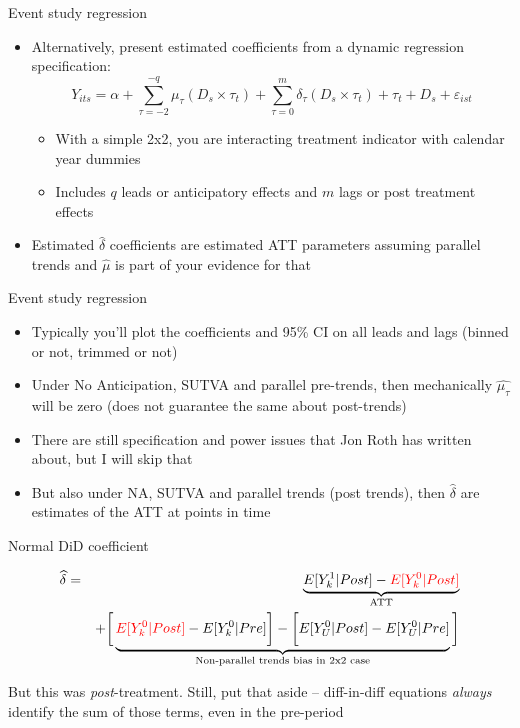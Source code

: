 \documentclass{beamer}
\begin{document}
\begin{frame}{Event study regression}
	
	\begin{itemize}
	\item Alternatively, present estimated coefficients from a dynamic regression specification:
 $$Y_{its} = \alpha + \sum_{\tau=-2}^{-q}\mu_{\tau} (D_s \times \tau_t) + \sum_{\tau=0}^m\delta_{\tau} (D_s \times \tau_t) + \tau_t + D_s + \varepsilon_{ist}$$
		\begin{itemize}
		\item With a simple 2x2, you are interacting treatment indicator with calendar year dummies
		\item Includes $q$ leads or anticipatory effects and $m$ lags or post treatment effects
		\end{itemize}
	\item Estimated $\widehat{\delta}$ coefficients are estimated ATT parameters assuming parallel trends and $\widehat{\mu}$ is part of your evidence for that
	\end{itemize}
\end{frame}

\begin{frame}{Event study regression}


\begin{itemize}
\item  Typically you'll plot the coefficients and 95\% CI on all leads and lags (binned or not, trimmed or not) 
\item Under No Anticipation, SUTVA and parallel pre-trends, then mechanically $\widehat{\mu_{\tau}}$ will be zero (does not guarantee the same about post-trends)
\item There are still specification and power issues that Jon Roth has written about, but I will skip that
\item But also under NA, SUTVA and parallel trends (post trends), then $\widehat{\delta}$ are estimates of the ATT at points in time
\end{itemize}

\end{frame}

\begin{frame}{Normal DiD coefficient}

\begin{eqnarray*}
\widehat{\delta} &=& \underbrace{E[Y^1_k | Post] - \textcolor{red}{E[Y^0_k | Post]}}_{\mathclap{\text{ATT}}} \\
&& + \bigg [  \underbrace{\textcolor{red}{E[Y^0_k | Post]} - E[Y^0_k | Pre] \bigg ] - \bigg [ E[Y^0_U | Post] - E[Y_U^0 | Pre] }_{\mathclap{\text{Non-parallel trends bias in 2x2 case}}} \bigg ]
\end{eqnarray*}

\bigskip

But this was \emph{post}-treatment.  Still, put that aside -- diff-in-diff equations \emph{always} identify the sum of those terms, even in the pre-period


\end{frame}
\end{document}
